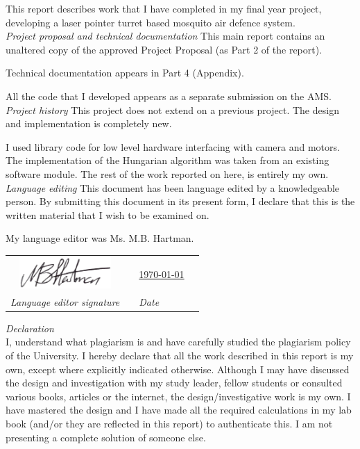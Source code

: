 
This report describes work that I have completed in my final year project, developing a laser pointer turret based mosquito air defence system.
\\[2ex]
\textit{Project proposal and technical documentation} \newline
This main report contains an unaltered copy of the approved Project Proposal (as Part 2 of the report).

Technical documentation appears in Part 4 (Appendix).

All the code that I developed appears as a separate submission on the AMS.
\\[2ex]
\textit{Project history} \newline
This project does not extend on a previous project. The design and implementation is completely new.

I used library code for low level hardware interfacing with camera and motors. The implementation of the Hungarian algorithm was taken from an existing software module. The rest of the work reported on here, is entirely my own.
\\[2ex]
\textit{Language editing} \newline
This document has been language edited by a knowledgeable person. By submitting this document in its present form, I declare that this is the written material that I wish to be examined on.

My language editor was Ms. M.B. Hartman.

\vspace*{0.5cm}

\begin{tabular}{cp{4cm}ll}
  \includegraphics[width=3.5cm]{figures/mich_handtekening.png} &  & \underline{\today} \\
  \textit{Language editor signature}                           &  & \textit{Date}
\end{tabular}

\vspace*{0.5cm}

\textit{Declaration}
\\[2ex]
I, \underline{\eprthecandidatename} understand what plagiarism is and have carefully studied the plagiarism policy of the University. I hereby declare that all the work described in this report is my own, except where explicitly indicated otherwise. Although I may have discussed the design and investigation with my study leader, fellow students or consulted various books, articles or the internet, the design/investigative work is my own. I have mastered the design and I have made all the required calculations in my lab book (and/or they are reflected in this report) to authenticate this. I am not presenting a complete solution of someone else.

